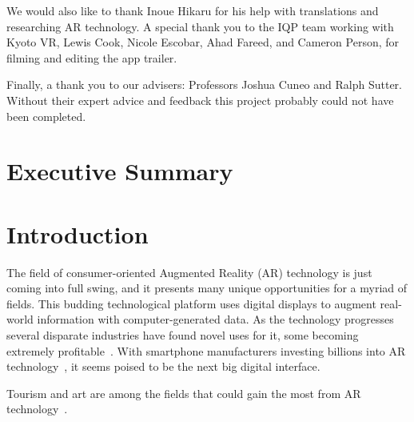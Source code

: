 \documentclass[a4paper, 10pt, american, titlepage]{article}
\begin{document}
We would also like to thank Inoue Hikaru for his help with translations and
researching AR technology. A special thank you to the IQP team working with
Kyoto VR, Lewis Cook, Nicole Escobar, Ahad Fareed, and Cameron Person, for
filming and editing the app trailer.

Finally, a thank you to our advisers: Professors Joshua Cuneo and Ralph Sutter.
Without their expert advice and feedback this project probably could not have
been completed.

\clearpage

\section*{Executive Summary}
\label{sec:executiveSummary}


\clearpage

{
\linespread{1}

\tableofcontents
{}
\newpage

\listoffigures
{}
\newpage

}


\section{Introduction}
\label{sec:introduction}

The field of consumer-oriented Augmented Reality (AR) technology is just coming
into full swing, and it presents many unique opportunities for a myriad of
fields. This budding technological platform uses digital displays to augment
real-world information with computer-generated data. As the technology
progresses several disparate industries have found novel uses for it, some
becoming extremely profitable~\autocite{webster2018}. With smartphone
manufacturers investing billions into AR technology~\autocite{mason2016}, it
seems poised to be the next big digital interface.

Tourism and art are among the fields that could gain the most from AR
technology~\autocite{saenz2009, katz2018}. 
\end{document}
